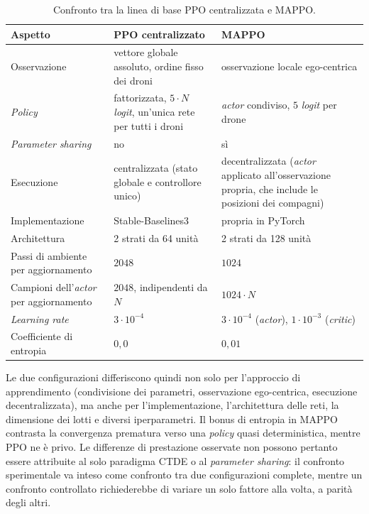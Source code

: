 \documentclass[12pt,a4paper,twoside]{report}
\newcommand{\fonte}[1][elaborazione propria]{\par\vspace{3pt}{\footnotesize\emph{Fonte: #1.}}}
\begin{document}
\begin{table}[htbp]
    \centering
    \begin{tabularx}{\textwidth}{l X X}
        \toprule
        \textbf{Aspetto} & \textbf{PPO centralizzato} & \textbf{MAPPO} \\
        \midrule
        Osservazione                       & vettore globale assoluto, ordine fisso dei droni & osservazione locale ego-centrica \\
        \emph{Policy}                      & fattorizzata, $5 \cdot N$ \emph{logit}, un'unica rete per tutti i droni & \emph{actor} condiviso, $5$ \emph{logit} per drone \\
        \emph{Parameter sharing}           & no & sì \\
        Esecuzione                         & centralizzata (stato globale e controllore unico) & decentralizzata (\emph{actor} applicato all'osservazione propria, che include le posizioni dei compagni) \\
        Implementazione                    & Stable-Baselines3 & propria in PyTorch \\
        Architettura                       & 2 strati da 64 unità & 2 strati da 128 unità \\
        Passi di ambiente per aggiornamento & $2048$ & $1024$ \\
        Campioni dell'\emph{actor} per aggiornamento & $2048$, indipendenti da $N$ & $1024 \cdot N$ \\
        \emph{Learning rate}               & $3 \cdot 10^{-4}$ & $3 \cdot 10^{-4}$ (\emph{actor}), $1 \cdot 10^{-3}$ (\emph{critic}) \\
        Coefficiente di entropia           & $0,0$ & $0,01$ \\
        \bottomrule
    \end{tabularx}
    \caption{Confronto tra la linea di base PPO centralizzata e MAPPO.}
    \label{tab:4_3}
    \fonte
\end{table}

Le due configurazioni differiscono quindi non solo per l'approccio di apprendimento (condivisione dei parametri, osservazione ego-centrica, esecuzione decentralizzata), ma anche per l'implementazione, l'architettura delle reti, la dimensione dei lotti e diversi iperparametri. Il bonus di entropia in MAPPO contrasta la convergenza prematura verso una \emph{policy} quasi deterministica, mentre PPO ne è privo. Le differenze di prestazione osservate non possono pertanto essere attribuite al solo paradigma CTDE o al \emph{parameter sharing}: il confronto sperimentale va inteso come confronto tra due configurazioni complete, mentre un confronto controllato richiederebbe di variare un solo fattore alla volta, a parità degli altri.
\end{document}
